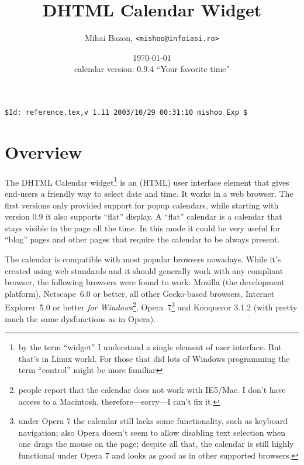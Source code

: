 \documentclass[a4paper,10pt]{article}
\title{DHTML Calendar Widget}
\author{Mihai Bazon, \texttt{<mishoo@infoiasi.ro>}}
\date{\today\\\vspace{0.2ex}
{\small calendar version: 0.9.4 ``Your favorite time''}
}
\begin{document}
\maketitle

{\small\verb|$Id: reference.tex,v 1.11 2003/10/29 00:31:10 mishoo Exp $|}
{\begin{small}\begin{quote}
{\begin{flushright}
\noindent
\end{flushright}}
\end{quote}\end{small}}
\tableofcontents


\section{Overview}

The DHTML Calendar widget\footnote
        {
        by the term ``widget'' I understand a single element of user interface.
        But that's in Linux world.  For those that did lots of Windows
        programming the term ``control'' might be more familiar
        }
is an (HTML) user interface element that gives end-users a friendly way to
select date and time.  It works in a web browser.  The first versions only provided
support for popup calendars, while starting with version 0.9 it also supports
``flat'' display.  A ``flat'' calendar is a calendar that stays visible in the
page all the time.  In this mode it could be very useful for ``blog'' pages and
other pages that require the calendar to be always present.

The calendar is compatible with most popular browsers nowadays.  While it's
created using web standards and it should generally work with any compliant
browser, the following browsers were found to work: Mozilla (the
development platform), Netscape~6.0 or better, all other Gecko-based browsers,
Internet Explorer~5.0 or better \emph{for Windows}\footnote{people report that the calendar does
not work with IE5/Mac.  I don't have access to a Macintosh,
therefore---sorry---I can't fix it.}, Opera~7\footnote
        { under Opera 7 the calendar still lacks some functionality, such as
        keyboard navigation; also Opera doesn't seem to allow disabling text
        selection when one drags the mouse on the page; despite all that, the
        calendar is still highly functional under Opera 7 and looks as good as
        in other supported browsers. } and Konqueror 3.1.2 (with pretty much the
same dysfunctions as in Opera).
\end{document}
